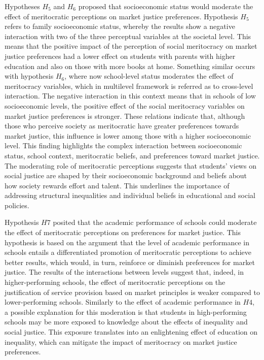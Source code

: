 \documentclass[
    behavsci,
    article,
    submit,
moreauthors
]{mdpi}
\begin{document}
Hypotheses \(H_5\) and \(H_6\) proposed that socioeconomic status would
moderate the effect of meritocratic perceptions on market justice
preferences. Hypothesis \(H_5\) refers to family socioeconomic status,
whereby the results show a negative interaction with two of the three
perceptual variables at the societal level. This means that the positive
impact of the perception of social meritocracy on market justice
preferences had a lower effect on students with parents with higher
education and also on those with more books at home. Something similar
occurs with hypothesis \(H_6\), where now school-level status moderates
the effect of meritocracy variables, which in multilevel framework is
referred as to cross-level interaction. The negative interaction in this
context means that in schools of low socioeconomic levels, the positive
effect of the social meritocracy variables on market justice preferences
is stronger. These relations indicate that, although those who perceive
society as meritocratic have greater preferences towards market justice,
this influence is lower among those with a higher socioeconomic level.
This finding highlights the complex interaction between socioeconomic
status, school context, meritocratic beliefs, and preferences toward
market justice. The moderating role of meritocratic perceptions suggests
that students' views on social justice are shaped by their socioeconomic
background and beliefs about how society rewards effort and talent. This
underlines the importance of addressing structural inequalities and
individual beliefs in educational and social policies.

Hypothesis \(H7\) posited that the academic performance of schools could
moderate the effect of meritocratic perceptions on preferences for
market justice. This hypothesis is based on the argument that the level
of academic performance in schools entails a differentiated promotion of
meritocratic perceptions to achieve better results, which would, in
turn, reinforce or diminish preferences for market justice. The results
of the interactions between levels suggest that, indeed, in
higher-performing schools, the effect of meritocratic perceptions on the
justification of service provision based on market principles is weaker
compared to lower-performing schools. Similarly to the effect of
academic performance in \(H4\), a possible explanation for this
moderation is that students in high-performing schools may be more
exposed to knowledge about the effects of inequality and social justice.
This exposure translates into an enlightening effect of education on
inequality, which can mitigate the impact of meritocracy on market
justice preferences.
\end{document}
